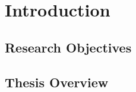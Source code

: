 \chapter{Introduction}



\section{Research Objectives} \label{s1.4}



\section{Thesis Overview} \label{s1.5}






